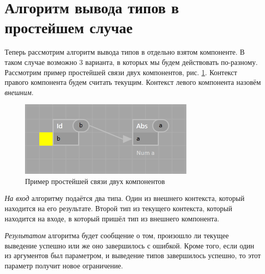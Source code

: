 \section{Алгоритм вывода типов в простейшем случае}
Теперь рассмотрим алгоритм вывода типов в отдельно взятом компоненте. В таком случае возможно 3 варианта, в которых мы будем действовать по-разному. Рассмотрим пример простейшей связи двух компонентов, рис. \ref{connection}. Контекст правого компонента будем считать текущим. Контекст левого компонента назовём \textit{внешним}.

\begin{figure}[h]
	\centering
	\includegraphics{img/connection.PNG}
	\caption{Пример простейшей связи двух компонентов}\label{connection}
\end{figure}

\textit{На вход} алгоритму подаётся два типа. Один из внешнего контекста, который находится на его результате. Второй тип из текущего контекста, который находится на входе, в который пришёл тип из внешнего компонента.

\textit{Результатом} алгоритма будет сообщение о том, произошло ли текущее выведение успешно или же оно завершилось с ошибкой. Кроме того, если один из аргументов был параметром, и выведение типов завершилось успешно, то этот параметр получит новое ограничение.

